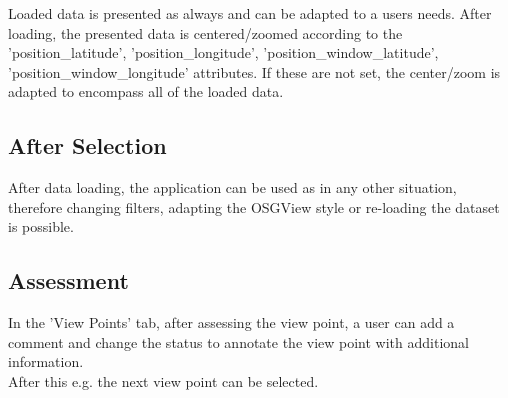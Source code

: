 Loaded data is presented as always and can be adapted to a users needs. After loading, the presented data is centered/zoomed according to the 'position\_latitude', 'position\_longitude', 'position\_window\_latitude', 'position\_window\_longitude' attributes. If these are not set, the center/zoom is adapted to encompass all of the loaded data.

\subsection{After Selection}

After data loading, the application can be used as in any other situation, therefore changing filters, adapting the OSGView style or re-loading the dataset is possible.

\subsection{Assessment}

In the 'View Points' tab, after assessing the view point, a user can add a comment and change the status to annotate the view point with additional information. \\

After this e.g. the next view point can be selected.
